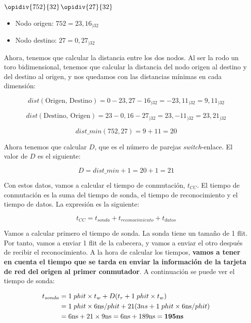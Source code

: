 \documentclass[11pt,a4paper]{article}
\begin{document}
\begin{minipage}{\textwidth}
  \centering
  $\opidiv{752}{32}$\qquad\qquad\qquad$\opidiv{27}{32}$
\end{minipage}

\begin{itemize}
	\item Nodo origen: $752 = 23, 16_{)32}$
	\item Nodo destino: $27 = 0, 27_{)32}$
\end{itemize}

Ahora, tenemos que calcular la distancia entre los dos nodos. Al ser la rodo un toro
bidimensional, tenemos que calcular la distancia del nodo origen al destino y del destino al
origen, y nos quedamos con las distancias mínimas en cada dimensión:

$$dist(\text{Origen, Destino}) = 0-23,  27-16_{)32} = -23, 11_{)32} = 9, 11_{)32}$$

$$dist(\text{Destino, Origen}) = 23-0,  16-27_{)32} = 23, -11_{)32} = 23, 21_{)32}$$

$$dist\_min(752, 27) = 9 + 11 = 20$$

Ahora tenemos que calcular $D$, que es el número de parejas \textit{switch}-enlace. El valor de
$D$ es el siguiente:

$$D = dist\_min + 1 = 20 + 1 = 21$$

Con estos datos, vamos a calcular el tiempo de conmutación, $t_{CC}$. El tiempo de
conmutación es la suma del tiempo de sonda, el tiempo de reconocimiento y el tiempo de datos.
La expresión es la siguiente:

$$t_{CC} = t_{sonda} + t_{reconocimiento} + t_{datos}$$

Vamos a calcular primero el tiempo de sonda. La sonda tiene un tamaño de 1 flit. Por tanto,
vamos a enviar 1 flit de la cabecera, y vamos a enviar el otro después de recibir el
reconocimiento. A la hora de calcular los tiempos, \textbf{vamos a tener en cuenta el tiempo
que se tarda en enviar la información de la tarjeta de red del origen al primer conmutador}.
A continuación se puede ver el tiempo de sonda:

\begin{equation}
\begin{split}
t_{sonda} &= 1\;phit \times t_w + D(t_r + 1\;phit \times t_w) \\
& = 1\;phit \times 6\text{ns}/phit + 21(3ns + 1\;phit \times 6\text{ns}/phit) \\
&= 6\text{ns} + 21 \times 9\text{ns} = 6\text{ns} + 189\text{ns} = \mathbf{195}\textbf{\text{ns}}
\end{split}
\end{equation}
\end{document}
